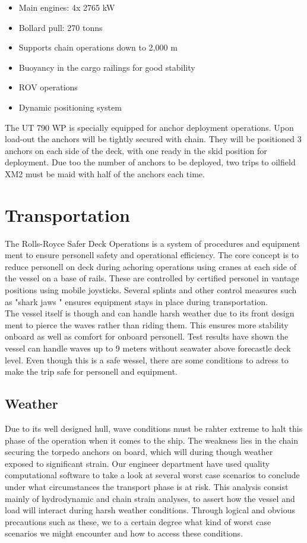 \documentclass[a4paper,norsk]{article}
\begin{document}
\begin{itemize}
\item Main engines: 4x 2765 kW
\item Bollard pull: 270 tonns
\item Supports chain operations down to 2,000 m
\item Buoyancy in the cargo railings for good stability
\item ROV operations
\item Dynamic positioning system 
\end{itemize}
The UT 790 WP is specially equipped for anchor deployment operations. Upon load-out the anchors will be tightly secured with chain. They will be positioned 3 anchors on each side of the deck, with one ready in the skid position for deployment. 
Due too the 
number of anchors to be deployed, two trips to  oilfield XM2 must be maid with half of the anchors each time.

\newpage
\section*{Transportation}

The Rolls-Royce Safer Deck Operations is a system of procedures and equipment ment to ensure personell safety and operational efficiency. The core concept is to reduce personell on deck during achoring operations using cranes at each side of the vessel on a base of rails. These are controlled by certified personel in vantage positions using mobile joysticks. Several splints and other control measures such as "shark jaws "  ensures equipment stays in place during transportation. \\
The vessel itself is though and can handle harsh weather due to its front design ment to pierce the waves rather than riding them. This ensures more stability onboard as well as comfort for onboard personell. Test results have shown the vessel can handle waves up to 9 meters without seawater above forecastle deck level. Even though this is a safe wessel, there are some conditions to adress to make the trip safe for personell and equipment.     
\subsection*{Weather}
Due to its well designed hull, wave conditions must be rahter extreme to halt this phase of the operation when it comes to the ship. The weakness lies in the chain securing the torpedo anchors on board, which will during though weather exposed to significant strain. Our engineer department have used quality computational software to take a look at several worst case scenarios to conclude under what circumstances the transport phase is at risk. This analysis consist mainly of hydrodynamic and chain strain analyses, to assert how the vessel and load will interact during harsh weather conditions. Through logical and obvious precautions such as these, we to a certain degree what kind of worst case scenarios we might encounter and how to access these conditions. 
\end{document}
